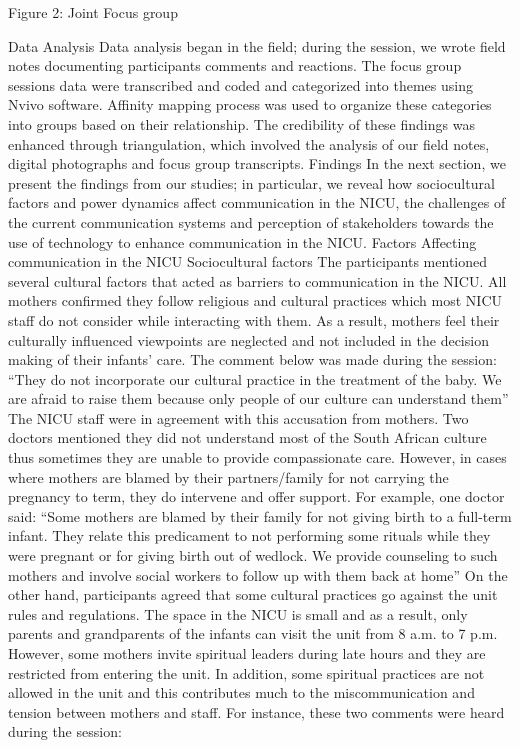                                           Figure 2: Joint Focus group

Data Analysis
Data analysis began in the field; during the session, we wrote field notes documenting participants comments and reactions. The focus group sessions data were transcribed and coded and categorized into themes using Nvivo software. Affinity mapping process was used to organize these categories into groups based on their relationship. The credibility of these findings was enhanced through triangulation, which involved the analysis of our field notes, digital photographs and focus group transcripts.
Findings
In the next section, we present the findings from our studies; in particular, we reveal how sociocultural factors and power dynamics affect communication in the NICU, the challenges of the current communication systems and perception of stakeholders towards the use of technology to enhance communication in the NICU.
Factors Affecting communication in the NICU
Sociocultural factors
The participants mentioned several cultural factors that acted as barriers to communication in the NICU. All mothers confirmed they follow religious and cultural practices which most NICU staff do not consider while interacting with them. As a result, mothers feel their culturally influenced viewpoints are neglected and not included in the decision making of their infants’ care. The comment below was made during the session:
“They do not incorporate our cultural practice in the treatment of the baby. We are afraid to raise them because only people of our culture can understand them”
The NICU staff were in agreement with this accusation from mothers. Two doctors mentioned they did not understand most of the South African culture thus sometimes they are unable to provide compassionate care. However, in cases where mothers are blamed by their partners/family for not carrying the pregnancy to term, they do intervene and offer support. For example, one doctor said:
“Some mothers are blamed by their family for not giving birth to a full-term infant. They relate this predicament to not performing some rituals while they were pregnant or for giving birth out of wedlock. We provide counseling to such mothers and involve social workers to follow up with them back at home”
On the other hand, participants agreed that some cultural practices go against the unit rules and regulations. The space in the NICU is small and as a result, only parents and grandparents of the infants can visit the unit from 8 a.m. to 7 p.m. However, some mothers invite spiritual leaders during late hours and they are restricted from entering the unit. In addition, some spiritual practices are not allowed in the unit and this contributes much to the miscommunication and tension between mothers and staff. For instance, these two comments were heard during the session:
